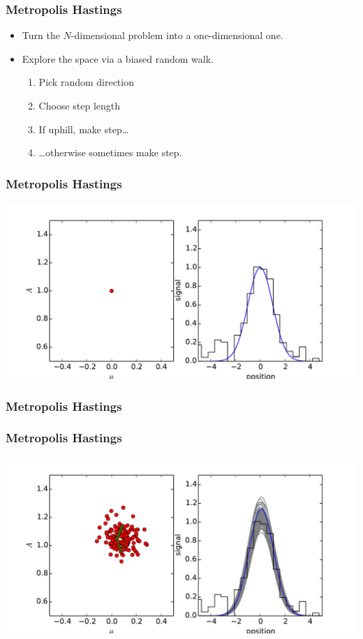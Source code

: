\documentclass[%
]{beamer}
\begin{document}
\begin{frame}
  \frametitle{Metropolis Hastings} 
  \begin{itemize}
      \pause
    \item Turn the $N$-dimensional problem into a one-dimensional one.
      \pause
    \item Explore the space via a biased random walk.
      \begin{enumerate}
          \pause
        \item Pick random direction
          \pause
        \item Choose step length
          \pause
        \item If uphill, make step\ldots
          \pause
        \item \ldots otherwise sometimes make step. 
      \end{enumerate}
  \end{itemize}
\end{frame}

\begin{frame}
  \frametitle{Metropolis Hastings} 
  \includegraphics[width=\textwidth]{movies/MCMC_0.pdf}
\end{frame}
\begin{frame}
  \frametitle{Metropolis Hastings} 
\end{frame}
\begin{frame}
  \frametitle{Metropolis Hastings} 
  \includegraphics[width=\textwidth]{movies/MCMC_1.pdf}
\end{frame}
\end{document}
